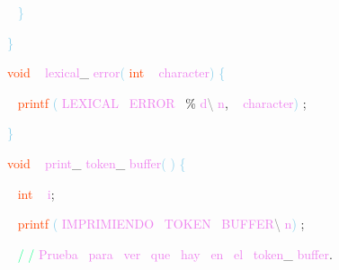 \documentclass[8, usernames, dvipsnames]{beamer}
\begin{document}
\begin{frame}
\textcolor{White}{\   }
\textcolor{SkyBlue}{\} }

 \textcolor{SkyBlue}{\} }

 
 \textcolor{OrangeRed}{void}
\textcolor{White}{\ }
\textcolor{Violet}{lexical}\textcolor{Sepia}{\_}
\textcolor{Violet}{error}\textcolor{SkyBlue}{(}
\textcolor{OrangeRed}{int}
\textcolor{White}{\ }
\textcolor{Violet}{character}\textcolor{SkyBlue}{)}
\textcolor{SkyBlue}{\{ }

 \textcolor{White}{\   }
\textcolor{OrangeRed}{printf}
\textcolor{SkyBlue}{(}
\textcolor{Violet}{LEXICAL}\textcolor{White}{\ }
\textcolor{Violet}{ERROR}\textcolor{White}{\ }
\textcolor{Apricot}{\%}
\textcolor{Violet}{d}\textcolor{Gray}{\textbackslash }
\textcolor{Violet}{n}\textcolor{Sepia}{,}
\textcolor{White}{\ }
\textcolor{Violet}{character}\textcolor{SkyBlue}{)}
\textcolor{Sepia}{;}

 \textcolor{SkyBlue}{\} }

 \textcolor{OrangeRed}{void}
\textcolor{White}{\ }
\textcolor{Violet}{print}\textcolor{Sepia}{\_}
\textcolor{Violet}{token}\textcolor{Sepia}{\_}
\textcolor{Violet}{buffer}\textcolor{SkyBlue}{(}
\textcolor{SkyBlue}{)}
\textcolor{SkyBlue}{\{ }

 \textcolor{White}{\   }
\textcolor{OrangeRed}{int}
\textcolor{White}{\ }
\textcolor{Violet}{i}\textcolor{Sepia}{;}

 \textcolor{White}{\   }
\textcolor{OrangeRed}{printf}
\textcolor{SkyBlue}{(}
\textcolor{Violet}{IMPRIMIENDO}\textcolor{White}{\ }
\textcolor{Violet}{TOKEN}\textcolor{White}{\ }
\textcolor{Violet}{BUFFER}\textcolor{Gray}{\textbackslash }
\textcolor{Violet}{n}\textcolor{SkyBlue}{)}
\textcolor{Sepia}{;}

 \textcolor{White}{\   }
\textcolor{SpringGreen}{/}
\textcolor{SpringGreen}{/}
\textcolor{Violet}{Prueba}\textcolor{White}{\ }
\textcolor{Violet}{para}\textcolor{White}{\ }
\textcolor{Violet}{ver}\textcolor{White}{\ }
\textcolor{Violet}{que}\textcolor{White}{\ }
\textcolor{Violet}{hay}\textcolor{White}{\ }
\textcolor{Violet}{en}\textcolor{White}{\ }
\textcolor{Violet}{el}\textcolor{White}{\ }
\textcolor{Violet}{token}\textcolor{Sepia}{\_}
\textcolor{Violet}{buffer}\textcolor{Sepia}{.}

 \end{frame}
\end{document}
